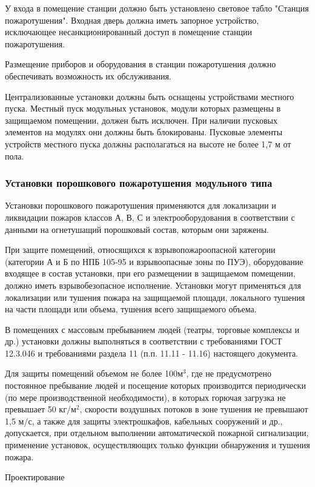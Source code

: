 У входа в помещение станции должно быть установлено световое табло "Станция пожаротушения". Входная дверь должна иметь запорное
устройство, исключающее несанкционированный доступ в помещение станции пожаротушения.

Размещение приборов и оборудования в станции пожаротушения должно обеспечивать возможность их обслуживания.

Централизованные установки должны быть оснащены устройствами местного пуска. Местный пуск модульных установок, модули которых
размещены в защищаемом помещении, должен быть исключен. При наличии пусковых элементов на модулях они должны быть блокированы.
Пусковые элементы устройств местного пуска должны располагаться на высоте не более 1,7 м от пола.

\subsubsection{Установки порошкового пожаротушения модульного типа}

Установки порошкового пожаротушения применяются для локализации и ликвидации пожаров классов А, В, С и электрооборудования
в соответствии с данными на огнетушащий порошковый состав, которым они заряжены.

При защите помещений, относящихся к взрывопожароопасной категории (категории А и Б по НПБ 105-95 и взрывоопасные зоны по ПУЭ),
оборудование входящее в состав установки, при его размещении в защищаемом помещении, должно иметь взрывобезопасное исполнение.
Установки могут применяться для локализации или тушения пожара на защищаемой площади, локального тушения на части площади или
объема, тушения всего защищаемого объема.

В помещениях с массовым пребыванием людей (театры, торговые комплексы и др.) установки должны выполняться в соответствии с требованиями
ГОСТ 12.3.046 и требованиями раздела 11 (п.п. 11.11 - 11.16) настоящего документа.

Для защиты помещений объемом не более 100м$^3$, где не предусмотрено постоянное пребывание людей и посещение которых производится
периодически (по мере производственной необходимости), в которых горючая загрузка не превышает 50 кг/м$^2$, скорости воздушных
потоков в зоне тушения не превышают 1,5 м/с, а также для защиты электрошкафов, кабельных сооружений и др., допускается,
при отдельном выполнении автоматической пожарной сигнализации, применение установок, осуществляющих только функции обнаружения
и тушения пожара.

Проектирование

